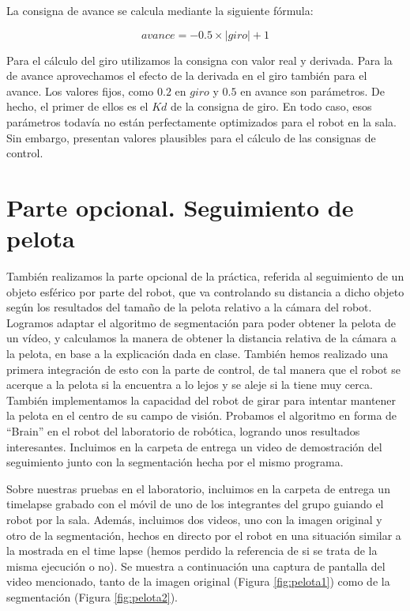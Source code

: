 \documentclass{article}
\begin{document}
        La consigna de avance se calcula mediante la siguiente fórmula:

        $$avance = -0.5 \times |giro| + 1$$

        Para el cálculo del giro utilizamos la consigna con valor real y derivada. Para la de avance aprovechamos el efecto de la derivada en el giro también para el avance. Los valores fijos, como $0.2$ en $giro$ y $0.5$ en avance son parámetros. De hecho, el primer de ellos es el $Kd$ de la consigna de giro. En todo caso, esos parámetros todavía no están perfectamente optimizados para el robot en la sala. Sin embargo, presentan valores plausibles para el cálculo de las consignas de control.

\section{Parte opcional. Seguimiento de pelota}
	También realizamos la parte opcional de la práctica, referida al seguimiento de un objeto esférico por parte del robot, que va controlando su distancia a dicho objeto según los resultados del tamaño de la pelota relativo a la cámara del robot. Logramos adaptar el algoritmo de segmentación para poder obtener la pelota de un vídeo, y calculamos la manera de obtener la distancia relativa de la cámara a la pelota, en base a la explicación dada en clase. También hemos realizado una primera integración de esto con la parte de control, de tal manera que el robot se acerque a la pelota si la encuentra a lo lejos y se aleje si la tiene muy cerca. También implementamos la capacidad del robot de girar para intentar mantener la pelota en el centro de su campo de visión. Probamos el algoritmo en forma de “Brain” en el robot del laboratorio de robótica, logrando unos resultados interesantes. Incluimos en la carpeta de entrega un video de demostración del seguimiento junto con la segmentación hecha por el mismo programa.

	Sobre nuestras pruebas en el laboratorio, incluimos en la carpeta de entrega un timelapse grabado con el móvil de uno de los integrantes del grupo guiando el robot por la sala. Además, incluimos dos videos, uno con la imagen original y otro de la segmentación, hechos en directo por el robot en una situación similar a la mostrada en el time lapse (hemos perdido la referencia de si se trata de la misma ejecución o no). Se muestra a continuación una captura de pantalla del video mencionado, tanto de la imagen original (Figura \ref{fig:pelota1}) como de la segmentación (Figura \ref{fig:pelota2}).
\end{document}
